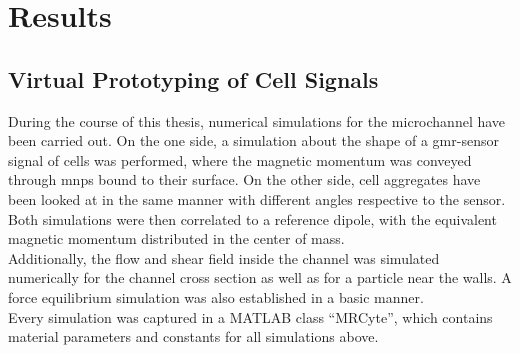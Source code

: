 \chapter{Results}
\section{Virtual Prototyping of Cell Signals}

During the course of this thesis, numerical simulations for the microchannel have been carried out. On the one side, a simulation about the shape of a \gls{gmr}-sensor signal of cells was performed, where the magnetic momentum was conveyed through \glspl{mnp} bound to their surface. On the other side, cell aggregates have been looked at in the same manner with different angles respective to the sensor. Both simulations were then correlated to a reference dipole, with the equivalent magnetic momentum distributed in the center of mass.\\
Additionally, the flow and shear field inside the channel was simulated numerically for the channel cross section as well as for a particle near the walls. A force equilibrium simulation was also established in a basic manner. \\
Every simulation was captured in a MATLAB class ``MRCyte'', which contains material parameters and constants for all simulations above.
